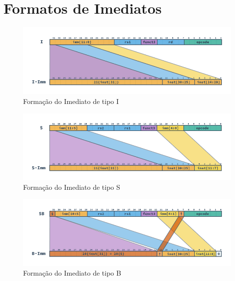 

\section{Formatos de Imediatos}

\begin{figure}[H]
\centering
    \includegraphics[width=1\linewidth]{images/RV_I_Imm.png}
    \caption{Formação do Imediato de tipo I
        }\label{fig:riscv_i_imm}
\end{figure}

\begin{figure}[H]
\centering
    \includegraphics[width=1\linewidth]{images/RV_S_Imm.png}
    \caption{Formação do Imediato de tipo S
        }\label{fig:riscv_s_imm}
\end{figure}

\begin{figure}[H]
\centering
    \includegraphics[width=1\linewidth]{images/RV_B_Imm.png}
    \caption{Formação do Imediato de tipo B
        }\label{fig:riscv_b_imm}
\end{figure}

